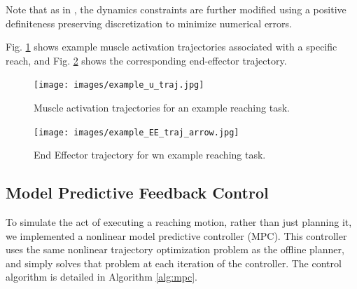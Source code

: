 \documentclass[letterpaper, 10pt, conference]{ieeeconf}
\newcommand{\todo}[1]{\textcolor{red}{\textbf{TODO:} #1}}
\begin{document}
Note that as in \cite{stochastic_model}, the dynamics constraints are further modified using a positive definiteness preserving discretization to minimize numerical errors.

Fig. \ref{fig:demo_activations} shows example muscle activation trajectories associated with a specific reach, and Fig. \ref{fig:demo_position} shows the corresponding end-effector trajectory.
\begin{figure}
    \centering
    \texttt{[image: images/example\_u\_traj.jpg]}
    \caption{Muscle activation trajectories for an example reaching task.}
    \label{fig:demo_activations}
\end{figure}

\begin{figure}
    \centering
    \texttt{[image: images/example\_EE\_traj\_arrow.jpg]}
    \caption{End Effector trajectory for wn example reaching task.}
    \label{fig:demo_position}
\end{figure}


\subsection{Model Predictive Feedback Control}
To simulate the act of executing a reaching motion, rather than just planning it, we implemented a nonlinear model predictive controller (MPC). This controller uses the same nonlinear trajectory optimization problem as the offline planner, and simply solves that problem at each iteration of the controller. The control algorithm is detailed in Algorithm \ref{alg:mpc}.
\end{document}

